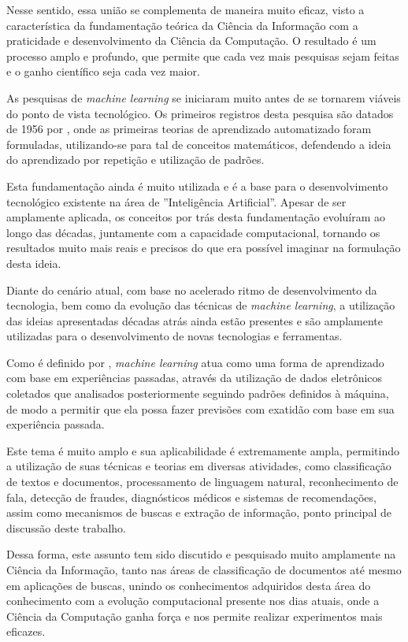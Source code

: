 Nesse sentido, essa união se complementa de maneira muito eficaz, visto a característica da fundamentação teórica da Ciência da Informação com a praticidade e desenvolvimento da Ciência da Computação. O resultado é um processo amplo e profundo, que permite que cada vez mais pesquisas sejam feitas e o ganho científico seja cada vez maior.

As pesquisas de \textit{machine learning} se iniciaram muito antes de se tornarem viáveis do ponto de vista tecnológico. Os primeiros registros desta pesquisa são datados de 1956 por \cite{machine-learning}, onde as primeiras teorias de aprendizado automatizado foram formuladas, utilizando-se para tal de conceitos matemáticos, defendendo a ideia do aprendizado por repetição e utilização de padrões.

Esta fundamentação ainda é muito utilizada e é a base para o desenvolvimento tecnológico existente na área de ''Inteligência Artificial''. Apesar de ser amplamente aplicada, os conceitos por trás desta fundamentação evoluíram ao longo das décadas, juntamente com a capacidade computacional, tornando os resultados muito mais reais e precisos do que era possível imaginar na formulação desta ideia.

Diante do cenário atual, com base no acelerado ritmo de desenvolvimento da tecnologia, bem como da evolução das técnicas de \textit{machine learning}, a utilização das ideias apresentadas décadas atrás ainda estão presentes e são amplamente utilizadas para o desenvolvimento de novas tecnologias e ferramentas.

Como é definido por \cite{foundations-machine-learning}, \textit{machine learning} atua como uma forma de aprendizado com base em experiências passadas, através da utilização de dados eletrônicos coletados que analisados posteriormente seguindo padrões definidos à máquina, de modo a permitir que ela possa fazer previsões com exatidão com base em sua experiência passada.

Este tema é muito amplo e sua aplicabilidade é extremamente ampla, permitindo a utilização de suas técnicas e teorias em diversas atividades, como classificação de textos e documentos, processamento de linguagem natural, reconhecimento de fala, detecção de fraudes, diagnósticos médicos e sistemas de recomendações, assim como mecanismos de buscas e extração de informação, ponto principal de discussão deste trabalho.

Dessa forma, este assunto tem sido discutido e pesquisado muito amplamente na Ciência da Informação, tanto nas áreas de classificação de documentos até mesmo em aplicações de buscas, unindo os conhecimentos adquiridos desta área do conhecimento com a evolução computacional presente nos dias atuais, onde a Ciência da Computação ganha força e nos permite realizar experimentos mais eficazes.


